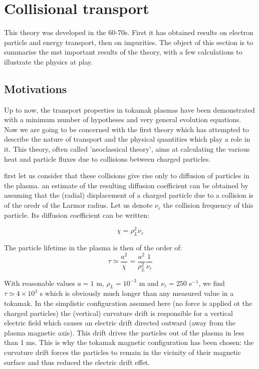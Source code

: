 \chapter{Collisional transport}
\label{chap:TransportCollisionnel}


This theory was developed in the 60-70s. First it has obtained results on electron particle and energy transport, then on impurities. The object of this section is to summarise the mst important results of the theory, with a few calculations to illustrate the physics at play.



		\section{Motivations}
		\label{sec:TransportCollisionnelMotivation}

Up to now, the transport properties in tokamak plasmas have been demonstrated with a minimum number of hypotheses and very general evolution equations. Now we are going to be concerned with the first theory which has attempted to describe the nature of transport and the physical quantities which play a role in it. This theory, often called 'neoclassical theory', aims at calculating the various heat and particle fluxes due to collisions between charged particles.

first let us consider that these collisions give rise only to diffusion of particles in the plasma. an estimate of the resulting diffusion coefficient can be obtained by assuming that the (radial) displacement of a charged particle due to a collision is of the oredr of the Larmor radius. Let us denote $\nu_c$ the collision frequency of this particle. Its diffusion coefficient can be written:

\[
		\chi = \rho_L^2 \nu_c
\]

The particle lifetime in the plasma is then of the order of:
\[
\tau \simeq \frac{a^2}{\chi} = \frac{a^2}{\rho_L^2}\frac{1}{\nu_c}
\]

With reasonable values $a = 1$ m, $\rho_L = 10^{-3}$ m and $\nu_c = 250$ s$^{-1}$, we find $\tau \simeq 4\times 10^3$ s which is obviously much longer than any measured value in a tokamak. In the simplistic configuration assumed here (no force is applied ot the charged particles) the (vertical) curvature drift is responsible for a vertical electric field which causes an electric drift directed outward (away from the plasma magnetic axis). This drift drives the particles out of the plasma in less than 1 ms. This is why the tokamak magnetic configuration has been chosen: the curvature drift forces the particles to remain in the vicinity of their magnetic surface and thus reduced the electric drift effet. 

